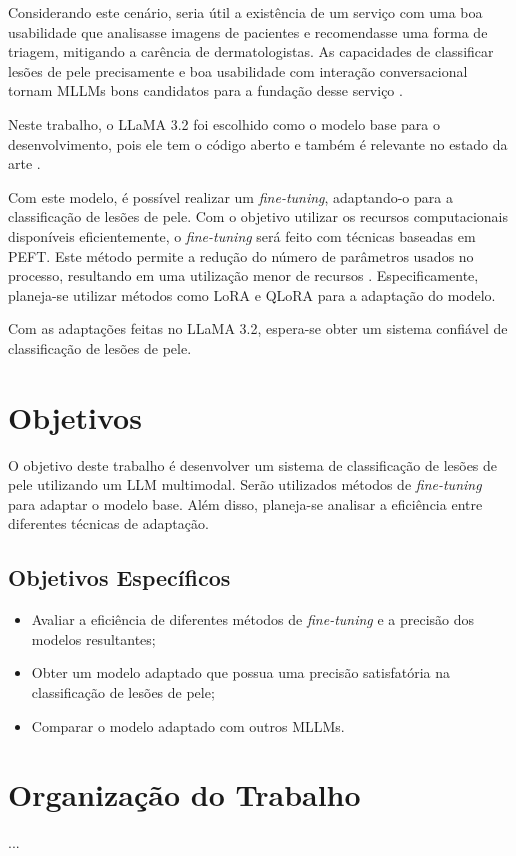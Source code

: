 Considerando este cenário, seria útil a existência de um serviço com uma boa usabilidade que analisasse imagens de pacientes e recomendasse uma forma de triagem,
mitigando a carência de dermatologistas. As capacidades de classificar lesões de pele precisamente e boa usabilidade com interação conversacional tornam \acp{MLLM}
bons candidatos para a fundação desse serviço \cite{mllm_success_rate}.

Neste trabalho, o \ac{LLaMA} 3.2 foi escolhido como o modelo base para o desenvolvimento, pois ele tem o código aberto e também é relevante no estado da arte
\cite{dubey2024llama}.


Com este modelo, é possível realizar um \textit{fine-tuning}, adaptando-o para a classificação de lesões de pele. Com o objetivo utilizar os recursos computacionais
disponíveis eficientemente, o \textit{fine-tuning} será feito com técnicas baseadas em \ac{PEFT}. Este método permite a redução do número de parâmetros usados no
processo, resultando em uma utilização menor de recursos \cite{peft}. Especificamente, planeja-se utilizar métodos como \ac{LoRA} e \ac{QLoRA} para a adaptação do modelo.

Com as adaptações feitas no \ac{LLaMA} 3.2, espera-se obter um sistema confiável de classificação de lesões de pele.


\section{Objetivos}

O objetivo deste trabalho é desenvolver um sistema de classificação de lesões de pele utilizando um \ac{LLM} multimodal. Serão utilizados métodos de \textit{fine-tuning}
para adaptar o modelo base. Além disso, planeja-se analisar a eficiência entre diferentes técnicas de adaptação.

\subsection*{Objetivos Específicos}

\begin{itemize}
    \item Avaliar a eficiência de diferentes métodos de \textit{fine-tuning} e a precisão dos modelos resultantes;
    \item Obter um modelo adaptado que possua uma precisão satisfatória na classificação de lesões de pele;
    \item Comparar o modelo adaptado com outros \acp{MLLM}.
\end{itemize}


\section{Organização do Trabalho} %

...
